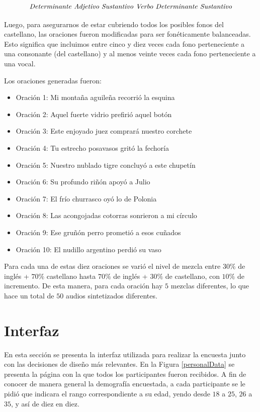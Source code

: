$$\textnormal{\textit{Determinante Adjetivo Sustantivo Verbo Determinante Sustantivo}}$$

Luego, para asegurarnos de estar cubriendo todos los posibles fonos del castellano, las oraciones fueron modificadas para ser fonéticamente balanceadas. Esto significa que incluimos entre cinco y diez veces cada fono perteneciente a una consonante (del castellano) y al menos veinte veces cada fono perteneciente a una vocal.

Los oraciones generadas fueron:

\begin{itemize}
\item Oración 1: Mi montaña aguileña recorrió la esquina
\item Oración 2: Aquel fuerte vidrio prefirió aquel botón
\item Oración 3: Este enjoyado juez comprará nuestro corchete
\item Oración 4: Tu estrecho posavasos gritó la fechoría
\item Oración 5: Nuestro nublado tigre concluyó a este chupetín
\item Oración 6: Su profundo riñón apoyó a Julio
\item Oración 7: El frío churrasco oyó lo de Polonia
\item Oración 8: Las acongojadas cotorras sonrieron a mi círculo
\item Oración 9: Ese gruñón perro prometió a esos cuñados
\item Oración 10: El nudillo argentino perdió su vaso
\end{itemize}

Para cada una de estas diez oraciones se varió el nivel de mezcla entre $30\%$ de inglés + $70\%$ castellano hasta $70\%$ de inglés + $30\%$ de castellano, con $10\%$ de incremento. De esta manera, para cada oración hay $5$ mezclas diferentes, lo que hace un total de $50$ audios sintetizados diferentes.

\section{Interfaz}\label{interfaz}

En esta sección se presenta la interfaz utilizada para realizar la encuesta junto con las decisiones de diseño más relevantes. En la Figura \ref{personalData} se presenta la página con la que todos los participantes fueron recibidos. A fin de conocer de manera general la demografía encuestada, a cada participante se le pidió que indicara el rango correspondiente a su edad, yendo desde $18$ a $25$, $26$ a $35$, y así de diez en diez.

